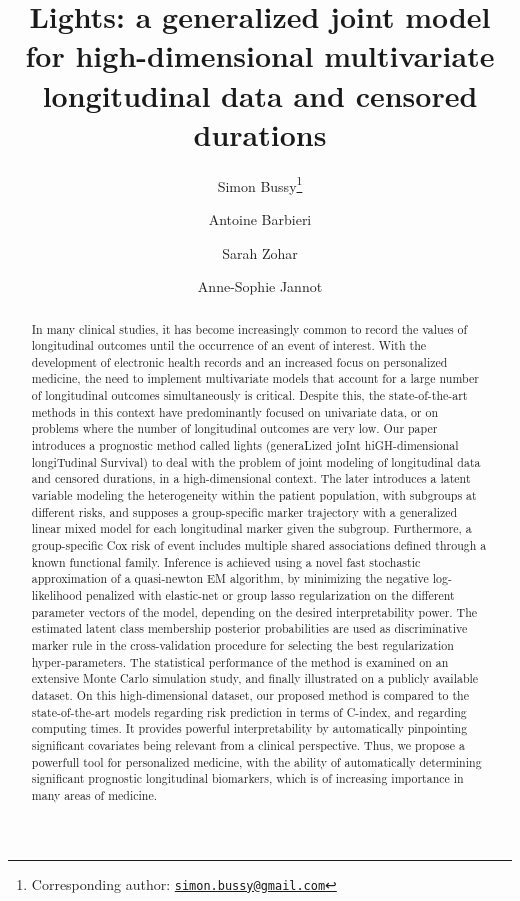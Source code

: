 \documentclass[11pt]{article}
\title{\vspace{-.5cm} Lights: a generalized joint model for high-dimensional multivariate longitudinal data and censored durations \vspace{.5cm}}
\author[1]{Simon Bussy\thanks{Corresponding author: \href{mailto:simon.bussy@gmail.com}{\texttt{simon.bussy@gmail.com}}}}
\author[2]{Antoine Barbieri}
\author[1]{Sarah Zohar}
\author[1,3]{Anne-Sophie Jannot}
\affil[1]{INSERM, UMRS 1138, Centre de Recherche des Cordeliers, Paris, France}
\affil[2]{INSERM, UMR 1219, Bordeaux Population Health Research Center, Univ. Bordeaux, France}
\affil[3]{Biomedical Informatics and Public Health Department, EGPH, APHP, Paris, France}
\date{}
\begin{document}
\maketitle

\vspace{-.5cm}

\begin{abstract}

In many clinical studies, it has become increasingly common to record the values of longitudinal outcomes until the occurrence of an event of interest. 
With the development of electronic health records and an increased focus on personalized medicine, the need to implement multivariate models that account for a large number of longitudinal outcomes simultaneously is critical. Despite this, the state-of-the-art methods in this context have predominantly focused on univariate data, or on problems where the number of longitudinal outcomes are very low.
Our paper introduces a prognostic method called lights (generaLized joInt hiGH-dimensional longiTudinal Survival) to deal with the problem of joint modeling of longitudinal data and censored durations, in a high-dimensional context. 
The later introduces a latent variable modeling the heterogeneity within the patient population, with subgroups at different risks, and supposes a group-specific marker trajectory with a generalized linear mixed model for each longitudinal marker given the subgroup. Furthermore, a group-specific Cox risk of event includes multiple shared associations defined through a known functional family.
Inference is achieved using a novel fast stochastic approximation of a quasi-newton EM algorithm, by minimizing the negative log-likelihood penalized with elastic-net or group lasso regularization on the different parameter vectors of the model, depending on the desired interpretability power.
The estimated latent class membership posterior probabilities are  used as discriminative marker rule in the cross-validation procedure for selecting the best regularization hyper-parameters.
The statistical performance of the method is examined on an extensive Monte Carlo simulation study, and finally illustrated on a publicly available dataset.
On this high-dimensional dataset, our proposed method is compared to the state-of-the-art models regarding risk prediction in terms of C-index, and regarding computing times. It provides powerful interpretability by automatically pinpointing significant covariates being relevant from a clinical perspective. Thus, we propose a powerfull tool for personalized medicine, with the ability of automatically determining significant prognostic longitudinal biomarkers, which is of increasing importance in many areas of medicine.

\end{abstract}
\end{document}

